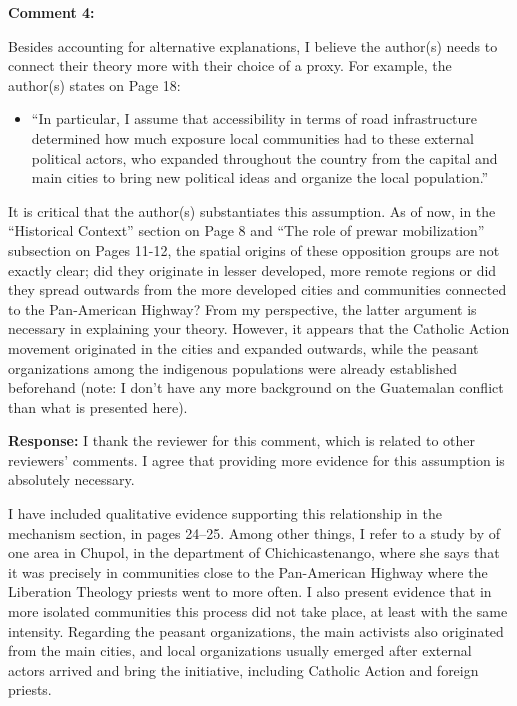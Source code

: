 \documentclass[12pt, a4paper, notitlepage]{article}
\begin{document}
\vspace{15pt}
\noindent\textbf{Comment 4:}
\begin{displayquote}
Besides accounting for alternative explanations, I believe the author(s) needs to connect their theory more with their choice of a proxy. For example, the author(s) states on Page 18:
\begin{itemize}
  \item[] ``In particular, I assume that accessibility in terms of road infrastructure determined how much exposure local communities had to these external political actors, who expanded throughout the country from the capital and main cities to bring new political ideas and organize the local population.''
\end{itemize}
It is critical that the author(s) substantiates this assumption. As of now, in the “Historical Context” section on Page 8 and “The role of prewar mobilization” subsection on Pages 11-12, the spatial origins of these opposition groups are not exactly clear; did they originate in lesser developed, more remote regions or did they spread outwards from the more developed cities and communities connected to the Pan-American Highway? From my perspective, the latter argument is necessary in explaining your theory. However, it appears that the Catholic Action movement originated in the cities and expanded outwards, while the peasant organizations among the indigenous populations were already established beforehand (note: I don’t have any more background on the Guatemalan conflict than what is presented here).
\end{displayquote}

\noindent\textbf{Response:} I thank the reviewer for this comment, which is related to other reviewers' comments. I agree that providing more evidence for this assumption is absolutely necessary.

I have included qualitative evidence supporting this relationship in the mechanism section, in pages 24--25. Among other things, I refer to a study by \citet{Esparza:2018uw} of one area in Chupol, in the department of Chichicastenango, where she says that it was precisely in communities close to the Pan-American Highway where the Liberation Theology priests went to more often. I also present evidence that in more isolated communities this process did not take place, at least with the same intensity. Regarding the peasant organizations, the main activists also originated from the main cities, and local organizations usually emerged after external actors arrived and bring the initiative, including Catholic Action and foreign priests.
\end{document}
